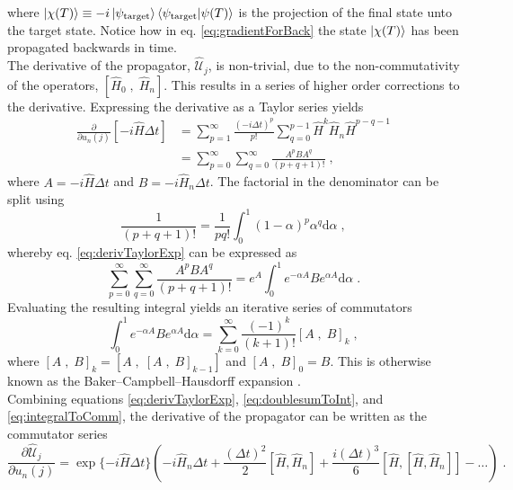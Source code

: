 where $\ket{\chi (T)} \equiv -i \ket{\psi_{\mathrm{target}}} \braket{\psi_{\mathrm{target}} | \psi (T)}$ is the projection of the final state unto the target state. Notice how in eq. \eqref{eq:gradientForBack} the state $\ket{\chi (T)}$ has been propagated backwards in time.\\ 
The derivative of the propagator, $\hat{\mathcal{U}}_{j}$, is non-trivial, due to the non-commutativity of the operators, $[ \hat{H}_0 \; , \; \hat{H}_n ]$. This results in a series of higher order corrections to the derivative.
Expressing the derivative as a Taylor series yields
\begin{align}
	\frac{\partial}{\partial u_n (j)} \left[ -i \hat{H} \Delta t \right] &= \sum_{p=1}^{\infty} \frac{ \left( -i \Delta t \right) ^p }{p!} \sum_{q=0}^{p-1} \hat{H}^k \hat{H}_n \hat{H}^{p-q-1} \nonumber \\
	&= \sum_{p=0}^{\infty} \sum_{q=0}^{\infty} \frac{A^p B A^q}{(p+q+1)!} \; ,
	\label{eq:derivTaylorExp}
\end{align}  
where $A = -i \hat{H} \Delta t$ and $B = -i \hat{H}_n \Delta t$. The factorial in the denominator can be split using
\begin{equation}
	\frac{1}{(p+q+1)!} = \frac{1}{p q !} \int_{0}^{1} (1-\alpha)^p \alpha^q \mathrm{d}\alpha \; ,
\end{equation}
whereby eq. \eqref{eq:derivTaylorExp} can be expressed as
\begin{equation}
	\sum_{p=0}^{\infty} \sum_{q=0}^{\infty} \frac{A^p B A^q}{(p+q+1)!} =  e^{A} \int_{0}^{1} e^{- \alpha A} B e^{ \alpha A} \mathrm{d}\alpha \; .
	\label{eq:doublesumToInt}
\end{equation}
Evaluating the resulting integral yields an iterative series of commutators
\begin{equation}
	\int_{0}^{1} e^{- \alpha A} B e^{ \alpha A} \mathrm{d}\alpha = \sum_{k=0}^{\infty} \frac{ (-1)^k}{(k+1)!} \left[ A \; , \; B \right]_k \; , 
	\label{eq:integralToComm}
\end{equation}
where $\left[ A \; , \; B \right]_k = \left[ A \; , \; \left[ A \; , \; B \right]_{k-1} \right]$ and $\left[ A \; , \; B \right]_0 = B$. This is otherwise known as the Baker–Campbell–Hausdorff expansion \cite{Wilcox1967}.\\
Combining equations \eqref{eq:derivTaylorExp}, \eqref{eq:doublesumToInt}, and \eqref{eq:integralToComm}, the derivative of the propagator can be written as the commutator series 
\begin{equation}
	\frac{\partial \hat{\mathcal{U}}_{j}}{\partial u_n (j)} = \exp \{ -i \hat{H} \Delta t \} \left( -i \hat{H}_n \Delta t + \frac{(\Delta t)^2}{2} \left[ \hat{H} , \hat{H}_n  \right] + \frac{i (\Delta t)^3}{6} \left[ \hat{H} , \left[ \hat{H} , \hat{H}_n  \right]  \right] - \ldots \right) \; .
	\label{eq:higherOrderGradient}
\end{equation}
